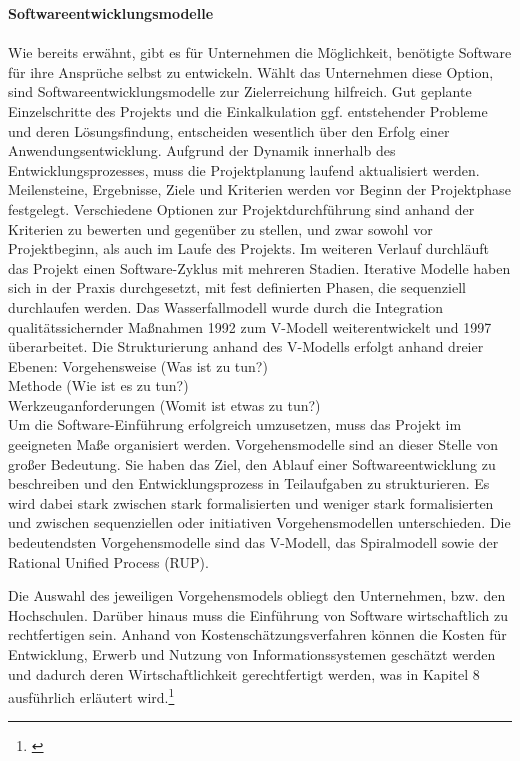 \textbf{Softwareentwicklungsmodelle}\\\\
Wie bereits erwähnt, gibt es für Unternehmen die Möglichkeit, benötigte Software für ihre Ansprüche selbst zu entwickeln. Wählt das Unternehmen diese Option,  sind Softwareentwicklungsmodelle zur Zielerreichung hilfreich.
Gut geplante Einzelschritte des Projekts und die Einkalkulation ggf. entstehender Probleme und deren Lösungsfindung, entscheiden wesentlich über den Erfolg einer Anwendungsentwicklung.
Aufgrund der Dynamik innerhalb des Entwicklungsprozesses, muss die Projektplanung laufend aktualisiert werden.
Meilensteine, Ergebnisse, Ziele und Kriterien werden vor Beginn der Projektphase festgelegt. Verschiedene Optionen zur Projektdurchführung sind anhand der Kriterien zu bewerten und gegenüber zu stellen, und zwar sowohl vor Projektbeginn, als auch im Laufe des Projekts.
Im weiteren Verlauf durchläuft das Projekt einen Software-Zyklus mit mehreren Stadien. 
Iterative Modelle haben sich in der Praxis durchgesetzt, mit fest definierten Phasen, die sequenziell durchlaufen werden.
Das Wasserfallmodell wurde durch die Integration qualitätssichernder Maßnahmen 1992 zum V-Modell weiterentwickelt und 1997 überarbeitet. Die Strukturierung anhand des V-Modells erfolgt anhand dreier Ebenen:
Vorgehensweise (Was ist zu tun?)\\
Methode (Wie ist es zu tun?)\\
Werkzeuganforderungen (Womit ist etwas zu tun?)\\
Um die Software-Einführung erfolgreich umzusetzen, muss das Projekt im geeigneten Maße organisiert werden.
Vorgehensmodelle sind an dieser Stelle von großer Bedeutung. Sie haben das Ziel, den Ablauf einer Softwareentwicklung zu beschreiben und den Entwicklungsprozess in Teilaufgaben zu strukturieren.
Es wird dabei stark zwischen stark formalisierten und weniger stark formalisierten und zwischen sequenziellen oder initiativen Vorgehensmodellen unterschieden. 
Die bedeutendsten Vorgehensmodelle sind das V-Modell, das Spiralmodell sowie der Rational Unified Process (RUP). 

Die Auswahl des jeweiligen Vorgehensmodels obliegt den Unternehmen, bzw. den Hochschulen.
Darüber hinaus muss die Einführung von Software wirtschaftlich zu rechtfertigen sein.
Anhand von Kostenschätzungsverfahren können die Kosten für Entwicklung, Erwerb und Nutzung von Informationssystemen geschätzt werden und dadurch deren Wirtschaftlichkeit gerechtfertigt werden, was in Kapitel 8 ausführlich erläutert wird.\footnote{\cite{krcmar_einfuhrung_2015}}

